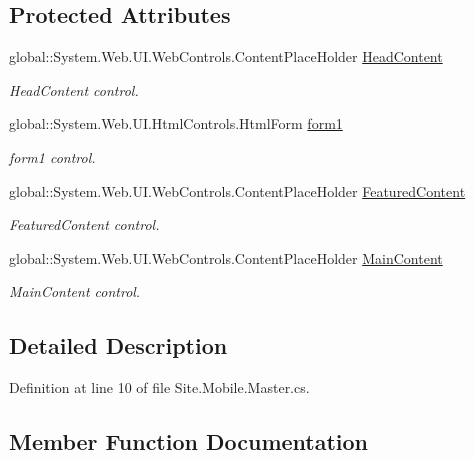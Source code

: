 \subsection*{Protected Attributes}
\begin{DoxyCompactItemize}
\item 
global\+::\+System.\+Web.\+U\+I.\+Web\+Controls.\+Content\+Place\+Holder \mbox{\hyperlink{classWebApplication_1_1Site__Mobile_a5b517c9a41ad5652f6e46e6f0130d6be}{Head\+Content}}
\begin{DoxyCompactList}\small\item\em Head\+Content control. \end{DoxyCompactList}\item 
global\+::\+System.\+Web.\+U\+I.\+Html\+Controls.\+Html\+Form \mbox{\hyperlink{classWebApplication_1_1Site__Mobile_a55b8e888061ac97b216ed6aee223f4bb}{form1}}
\begin{DoxyCompactList}\small\item\em form1 control. \end{DoxyCompactList}\item 
global\+::\+System.\+Web.\+U\+I.\+Web\+Controls.\+Content\+Place\+Holder \mbox{\hyperlink{classWebApplication_1_1Site__Mobile_a61a10c5df64029fe6271b69010a87f4d}{Featured\+Content}}
\begin{DoxyCompactList}\small\item\em Featured\+Content control. \end{DoxyCompactList}\item 
global\+::\+System.\+Web.\+U\+I.\+Web\+Controls.\+Content\+Place\+Holder \mbox{\hyperlink{classWebApplication_1_1Site__Mobile_a202ba18830e6285a2bb9d00ef105401c}{Main\+Content}}
\begin{DoxyCompactList}\small\item\em Main\+Content control. \end{DoxyCompactList}\end{DoxyCompactItemize}


\subsection{Detailed Description}


Definition at line 10 of file Site.\+Mobile.\+Master.\+cs.



\subsection{Member Function Documentation}
\mbox{\label{classWebApplication_1_1Site__Mobile_a47842f83cf904552df612a7b2eb3d14c}} 
